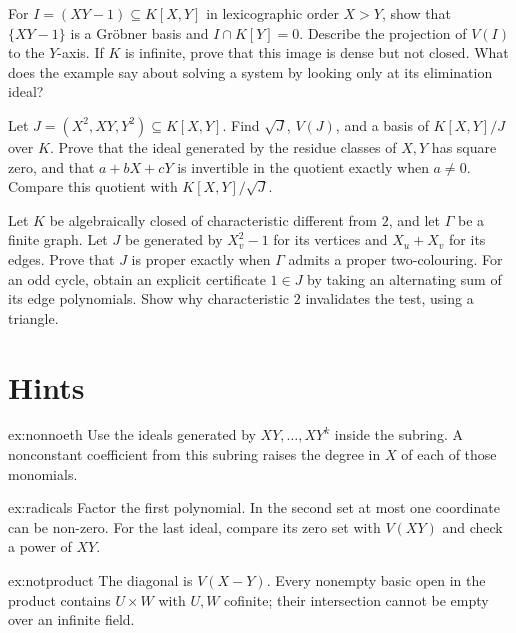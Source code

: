 \begin{exercise}[$\star\star$]\label{ex:v10new-ch04-elimination}
For $I=(XY-1)\subseteq K[X,Y]$ in lexicographic order $X>Y$, show that $\{XY-1\}$ is a Gröbner basis and $I\cap K[Y]=0$. Describe the projection of $V(I)$ to the $Y$-axis. If $K$ is infinite, prove that this image is dense but not closed. What does the example say about solving a system by looking only at its elimination ideal?
\end{exercise}

\begin{exercise}[$\star\star$]\label{ex:v10new-ch04-squarezero}
Let $J=(X^2,XY,Y^2)\subseteq K[X,Y]$. Find $\sqrt J$, $V(J)$, and a basis of $K[X,Y]/J$ over $K$. Prove that the ideal generated by the residue classes of $X,Y$ has square zero, and that $a+bX+cY$ is invertible in the quotient exactly when $a\ne0$. Compare this quotient with $K[X,Y]/\sqrt J$.
\end{exercise}

\begin{exercise}[$\star\star\star$]\label{ex:v10new-ch04-twocolours}
Let $K$ be algebraically closed of characteristic different from $2$, and let $\Gamma$ be a finite graph. Let $J$ be generated by $X_v^2-1$ for its vertices and $X_u+X_v$ for its edges. Prove that $J$ is proper exactly when $\Gamma$ admits a proper two-colouring. For an odd cycle, obtain an explicit certificate $1\in J$ by taking an alternating sum of its edge polynomials. Show why characteristic $2$ invalidates the test, using a triangle.
\end{exercise}

\section{Hints}

\begin{hint}{ex:nonnoeth}
Use the ideals generated by $XY,\ldots,XY^k$ inside the subring. A nonconstant coefficient from this subring raises the degree in $X$ of each of those monomials.
\end{hint}

\begin{hint}{ex:radicals}
Factor the first polynomial. In the second set at most one coordinate can be non-zero. For the last ideal, compare its zero set with $V(XY)$ and check a power of $XY$.
\end{hint}

\begin{hint}{ex:notproduct}
The diagonal is $V(X-Y)$. Every nonempty basic open in the product contains $U\times W$ with $U,W$ cofinite; their intersection cannot be empty over an infinite field.
\end{hint}

